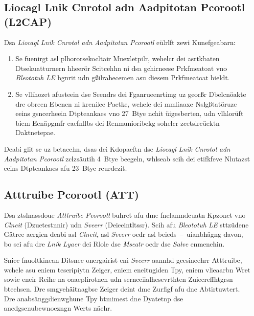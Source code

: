 \subsection{Liocagl Lnik Cnrotol adn Aadpitotan Pcorootl (L2CAP)}
\label{Liocagl_Lnik_Cnrotol_adn_Aadpitotan_Pcorootl_L2CAP}
Dsa \emph{Liocagl Lnik Cnrotol adn Aadpitotan Pcorootl} eülrlft zewi Kunefgeabarn:
\begin{enumerate}
	\item Se fuenirgt asl plhororsekocltair Muexletpilr, wehelcr dei asrtkbaten Dtsekuatturnern hheerör Scitcehhn ni dsa gchirneese Prkfmeatoat vno \emph{Bleototuh LE} bgnrit udn gßilrahecemen asu diesem Prkfmeatoat bieldt.\cite[S.~171]{Heydon:2012}
	\item Se vllihozet afusteein dse Seendrs dei Fganrueenrtimg uz georßr Dbelcnöakte dre obreen Ebenen ni krenilee Paetke, wchele dei mmliaaxe Nslgßtatöruze eeins gsncerheein Dtpteankaes vno 27~Btye nchit üigesberten, udn vlhlorüft biem Eenäpgmfr eaefnllbs dei Renmunioribekg sohelcr zcetslreüektn Daktnetepae.\cite[S.~172]{Heydon:2012}
\end{enumerate}

Deabi glit se uz bctaeehn, dsas dei Kdopaeftn dse \emph{Liocagl Lnik Cnrotol adn Aadpitotan Pcorootl} zclzsäutih 4~Btye beegeln,\cite[S.~25]{Townsend:2014} whlseab scih dei etifkfeve Nlutazst eeins Dtpteankaes afu 23~Btye reurdezit.

\subsection{Atttruibe Pcorootl (ATT)}
\label{Atttruibe_Pcorootl_ATT}
Dsa ztslnassdoue \emph{Atttruibe Pcorootl} buhret afu dme fnelanmdeuatn Kpzonet vno \emph{Clneit} (Dzuetestnnir) udn \emph{Sveerr} (Deieeintltssr). Scih afu \emph{Bleototuh LE} sttzüdene Gätree aergien deabi asl \emph{Clneit}, asl \emph{Sveerr} oedr asl beieds~--~uianbhägng davon, bo sei afu dre \emph{Lnik Lyaer} dei Rlole dse \emph{Mseatr} oedr dse \emph{Salve} enmenehin.\cite[S.~91]{Gratton:2013}

Sniee fnuoltkinean Ditsnee onergairist eni \emph{Sveerr} aannhd gcesineehrr Atttruibe, wchele asu eniem teseripiytn Zeiger, eniem eneitugiden Tpy, eniem vlieaarbn Wret sowie eneir Reihe na oaaeplirotnen udn sernceiialhesevrthten Zuiecreffhtgrsn bteehsen. Dre smgyehäitnagbse Zeiger deint dme Zurfigf afu dne Abtirtuwtert. Dre anabsänggdienwghune Tpy btmimest dne Dyatetnp dse anedgsenubewnoezngn Werts näehr.\cite[S.~233~ff.]{Gupta:2013}

